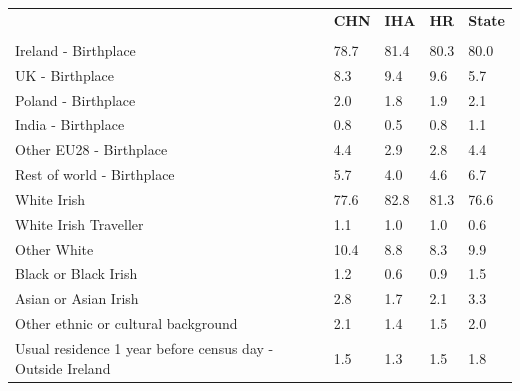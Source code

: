 \documentclass{article}
\begin{document}
\pagebreak
\begin{table}[h]	
\centering
		\begin{tabular}{KTTTT}
  \hline
& \textbf{CHN} & \textbf{IHA} & \textbf{HR}& \textbf{State}\\ 
  \hline
    \\ 
    \hline
Ireland - Birthplace & 78.7& 81.4& 80.3& 80.0\\
UK - Birthplace & 8.3& 9.4& 9.6& 5.7\\
Poland - Birthplace & 2.0& 1.8& 1.9& 2.1\\
India - Birthplace & 0.8& 0.5& 0.8& 1.1\\
Other EU28 - Birthplace & 4.4& 2.9& 2.8& 4.4\\
Rest of world - Birthplace & 5.7& 4.0& 4.6& 6.7\\
    \hline
White Irish & 77.6& 82.8& 81.3& 76.6\\
White Irish Traveller & 1.1& 1.0& 1.0& 0.6\\
Other White & 10.4&  8.8&  8.3&  9.9\\
Black or Black Irish & 1.2& 0.6& 0.9& 1.5\\
Asian or Asian Irish & 2.8& 1.7& 2.1& 3.3\\
Other ethnic or cultural background & 2.1& 1.4& 1.5& 2.0\\
    \hline
Usual residence 1 year before census day - Outside Ireland & 1.5& 1.3& 1.5& 1.8\\


\end{tabular}
\end{table}
\end{document}

